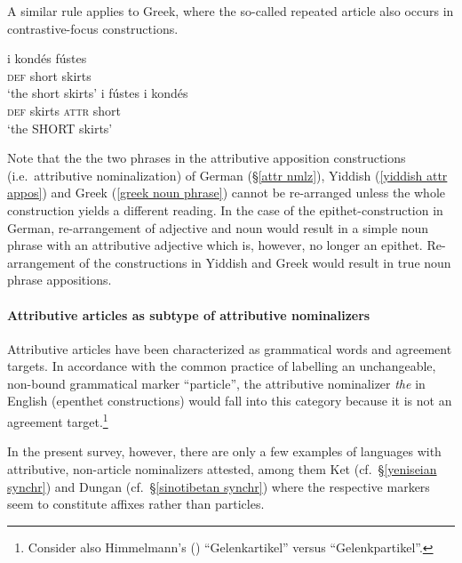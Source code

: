A similar rule applies to Greek, where the so-called repeated article also occurs in contrastive-focus constructions. 
\begin{exe}
\ex
{} \label{greek noun phrase}
\begin{xlist}
\ex
\gll 	i kondés fústes\\
	\textsc{def} short skirts\\
\glt	‘the short skirts’
\ex 
\gll 	i fústes i kondés\\
	\textsc{def} skirts \textsc{attr} short\\
\glt	‘the SHORT skirts’
\end{xlist}
\end{exe}
Note that the the two phrases in the attributive apposition constructions (i.e.~attributive nominalization) of German (\S\ref{attr nmlz}), Yiddish (\ref{yiddish attr appos}) and Greek (\ref{greek noun phrase}) cannot be re-arranged unless the whole construction yields a different reading. In the case of the epithet-construction in German, re-arrangement of adjective and noun would result in a simple noun phrase with an attributive adjective which is, however, no longer an epithet. Re-arrangement of the constructions in Yiddish and Greek would result in true noun phrase appositions.

\paragraph{Attributive articles as subtype of attributive nominalizers}
Attributive articles have been characterized as grammatical words and agreement targets. In accordance with the common practice of labelling an unchangeable, non-bound grammatical marker “particle”, the attributive nominalizer \textit{the} in English (epen\-thet constructions) would fall into this category because it is not an agreement target.\footnote{Consider also Himmelmann's (\citeyear{himmelmann1997}) “Gelenkartikel” versus “Gelenkpartikel”.}

In the present survey, however, there are only a few examples of languages with attributive, non-article nominalizers attested, among them Ket (cf.~\S\ref{yeniseian synchr}) and Dungan (cf.~\S\ref{sinotibetan synchr}) where the respective markers seem to constitute affixes rather than particles.

